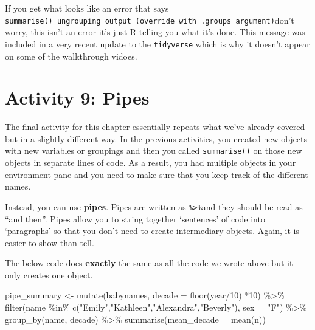 \documentclass[
  oneside]{book}
\newenvironment{Shaded}{\begin{snugshade}}{\end{snugshade}}
\newcommand{\AttributeTok}[1]{\textcolor[rgb]{0.77,0.63,0.00}{#1}}
\newcommand{\DecValTok}[1]{\textcolor[rgb]{0.00,0.00,0.81}{#1}}
\newcommand{\FunctionTok}[1]{\textcolor[rgb]{0.00,0.00,0.00}{#1}}
\newcommand{\NormalTok}[1]{#1}
\newcommand{\OtherTok}[1]{\textcolor[rgb]{0.56,0.35,0.01}{#1}}
\newcommand{\SpecialCharTok}[1]{\textcolor[rgb]{0.00,0.00,0.00}{#1}}
\newcommand{\StringTok}[1]{\textcolor[rgb]{0.31,0.60,0.02}{#1}}
\begin{document}
\begin{info}
If you get what looks like an error that says
\texttt{summarise()\ ungrouping\ output\ (override\ with\ .groups\ argument)}don't
worry, this isn't an error it's just R telling you what it's done. This
message was included in a very recent update to the \texttt{tidyverse}
which is why it doesn't appear on some of the walkthrough vidoes.
\end{info}

\hypertarget{activity-9-pipes}{%
\section{Activity 9: Pipes}\label{activity-9-pipes}}

The final activity for this chapter essentially repeats what we've already covered but in a slightly different way. In the previous activities, you created new objects with new variables or groupings and then you called \texttt{summarise()} on those new objects in separate lines of code. As a result, you had multiple objects in your environment pane and you need to make sure that you keep track of the different names.

Instead, you can use \textbf{pipes}. Pipes are written as \texttt{\%\textgreater{}\%}and they should be read as ``and then''. Pipes allow you to string together `sentences' of code into `paragraphs' so that you don't need to create intermediary objects. Again, it is easier to show than tell.

The below code does \textbf{exactly} the same as all the code we wrote above but it only creates one object.

\begin{Shaded}
\begin{Highlighting}[]
\NormalTok{pipe\_summary }\OtherTok{\textless{}{-}} \FunctionTok{mutate}\NormalTok{(babynames, }\AttributeTok{decade =} \FunctionTok{floor}\NormalTok{(year}\SpecialCharTok{/}\DecValTok{10}\NormalTok{) }\SpecialCharTok{*}\DecValTok{10}\NormalTok{) }\SpecialCharTok{\%\textgreater{}\%}
  \FunctionTok{filter}\NormalTok{(name }\SpecialCharTok{\%in\%} \FunctionTok{c}\NormalTok{(}\StringTok{"Emily"}\NormalTok{,}\StringTok{"Kathleen"}\NormalTok{,}\StringTok{"Alexandra"}\NormalTok{,}\StringTok{"Beverly"}\NormalTok{), sex}\SpecialCharTok{==}\StringTok{"F"}\NormalTok{) }\SpecialCharTok{\%\textgreater{}\%}
  \FunctionTok{group\_by}\NormalTok{(name, decade) }\SpecialCharTok{\%\textgreater{}\%}
  \FunctionTok{summarise}\NormalTok{(}\AttributeTok{mean\_decade =} \FunctionTok{mean}\NormalTok{(n))}
\end{Highlighting}
\end{Shaded}
\end{document}
